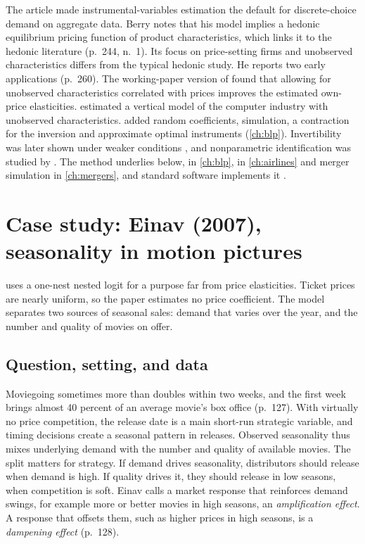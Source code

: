 The article made instrumental-variables estimation the default for discrete-choice demand on aggregate data.
Berry notes that his model implies a hedonic equilibrium pricing function of product characteristics, which links it
to the hedonic literature (p.~244, n.~1). Its focus on price-setting firms and unobserved characteristics differs
from the typical hedonic study. He reports two early applications (p.~260). The working-paper version of
\citet{BerryLevinsohnPakes1995} found that allowing for unobserved characteristics correlated with prices improves
the estimated own-price elasticities. \citet{Greenstein1992} estimated a vertical model of the computer industry with unobserved characteristics.
\citet{BerryLevinsohnPakes1995} added random coefficients, simulation, a contraction for the inversion and
approximate optimal instruments (\cref{ch:blp}). Invertibility was later shown under weaker conditions
\citep{BerryGandhiHaile2013}, and nonparametric identification was studied by \citet{BerryHaile2014}. The method
underlies \citet{Einav2007} below, \citet{Nevo2001} in \cref{ch:blp}, \citet{BerryCarnallSpiller2006} in
\cref{ch:airlines} and merger simulation in \cref{ch:mergers}, and standard software implements it
\citep{ConlonGortmaker2020}.

\section{Case study: Einav (2007), seasonality in motion pictures}\label{sec:07-einav}

\citet{Einav2007} uses a one-nest nested logit for a purpose far from price elasticities. Ticket prices are nearly
uniform, so the paper estimates no price coefficient. The model separates two sources of seasonal sales: demand
that varies over the year, and the number and quality of movies on offer.

\subsection{Question, setting, and data}\label{sec:07-einav-setting}

Moviegoing sometimes more than doubles within two weeks, and the first week brings almost 40 percent of an average
movie's box office (p.~127). With virtually no price competition, the release date is a main short-run strategic
variable, and timing decisions create a seasonal pattern in releases. Observed seasonality thus mixes underlying
demand with the number and quality of available movies. The split matters for strategy. If demand drives
seasonality, distributors should release when demand is high. If quality drives it, they should release in low
seasons, when competition is soft. Einav calls a market response that reinforces demand swings, for example more
or better movies in high seasons, an \emph{amplification effect}. A response that offsets them, such as higher
prices in high seasons, is a \emph{dampening effect} (p.~128).

